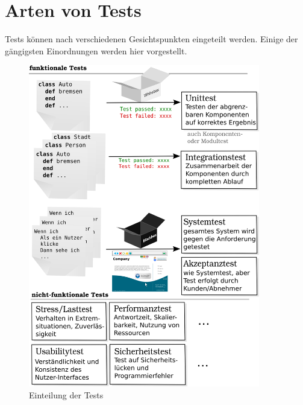 
\section{Arten von Tests}
Tests können nach verschiedenen Gesichtspunkten eingeteilt werden. Einige der gängigsten Einordnungen werden hier vorgestellt.
\begin{figure}[hp]
 \centering
 \includegraphics[width=0.9\textwidth]{./diagrams/testarten.png}
 \caption{Einteilung der Tests}
 \label{fig:testArten}
\end{figure}

